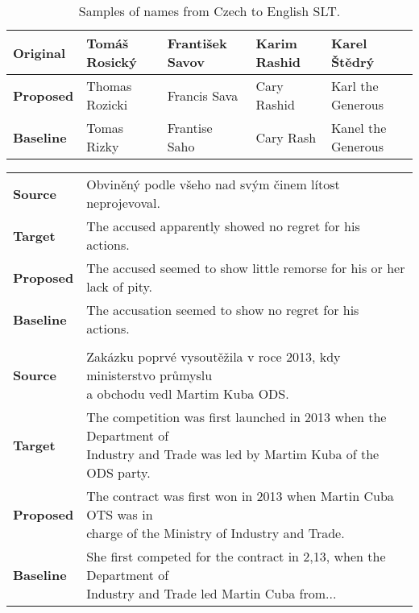 \begin{table}[H]
	\centering
	\small
	\begin{tabular}{l|llll}
		\textbf{Original} & Tomáš Rosický & František Savov  & Karim Rashid     & Karel Štědrý       \\ \hline
		\textbf{Proposed} & Thomas Rozicki     & Francis Sava & Cary Rashid      & Karl the Generous  \\
		\textbf{Baseline} & Tomas Rizky    & Frantise Saho    & Cary Rash & Kanel the Generous
	\end{tabular}
	\caption{Samples of names from Czech to English SLT.}
	\label{tab:cs_en_names}
\end{table}

\begin{table}[H]
	\centering
	\begin{tabular}{ll}
		\multicolumn{1}{l|}{\textbf{Source}}   & Obviněný podle všeho nad svým činem lítost neprojevoval.      \\
		\multicolumn{1}{l|}{\textbf{Target}}   & The accused apparently showed no regret for his actions. \\
		\multicolumn{1}{l|}{\textbf{Proposed}} & The accused seemed to show little remorse for his or her lack of pity.      \\
		\multicolumn{1}{l|}{\textbf{Baseline}} & The accusation seemed to show no regret for his actions.    \\
		\textbf{}                              &                                                           \\
		\multicolumn{1}{l|}{\textbf{Source}}   & \makecell[l]{Zakázku poprvé vysoutěžila v roce 2013, kdy ministerstvo průmyslu\\ a obchodu vedl Martim Kuba ODS.}      \\
		\multicolumn{1}{l|}{\textbf{Target}}   & \makecell[l]{The competition was first launched in 2013 when the Department of\\ Industry and Trade was led by Martim Kuba of the ODS party.}      \\
		\multicolumn{1}{l|}{\textbf{Proposed}} & \makecell[l]{The contract was first won in 2013 when Martin Cuba OTS was in\\ charge of the Ministry of Industry and Trade.}                 \\
		\multicolumn{1}{l|}{\textbf{Baseline}} & \makecell[l]{She first competed for the contract in 2,13, when the Department of\\ Industry and Trade led Martin Cuba from...}      \\

\end{tabular}
\end{table}
